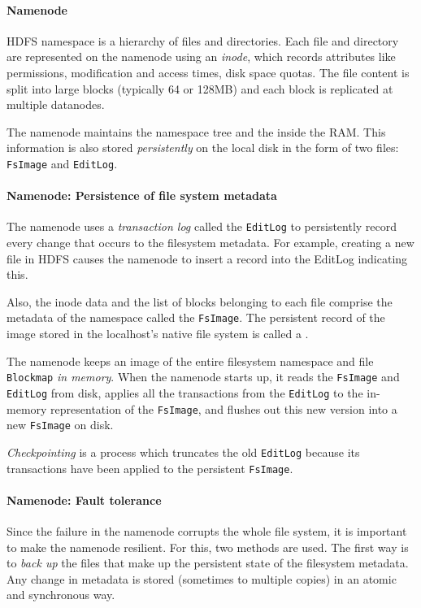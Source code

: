 \documentclass{memo}
\begin{document}
\paragraph{Namenode}
HDFS namespace is a hierarchy of files and directories. Each file and
directory are represented on the namenode using an {\em inode\/}, which
records attributes like permissions, modification and access times, disk space
quotas. The file content is split into large blocks (typically 64 or 128MB)
and each block is replicated at multiple datanodes. 

The namenode maintains the namespace tree and the  inside the RAM. This information is also stored {\em
  persistently\/} on the local disk 
in the form of two files: {\tt FsImage} and {\tt EditLog}. 

\paragraph{Namenode: Persistence of file system metadata}
The namenode uses a {\em transaction log\/} called the {\tt EditLog} to
persistently record every 
change that occurs to the filesystem metadata. For example, creating a new
file in HDFS causes the namenode to insert a record into the EditLog
indicating this. 

Also, the inode data and the list of blocks belonging to each file comprise
the metadata of the namespace called the {\tt FsImage}. The persistent record
of the image stored in the localhost's native file system is called a
. 

The namenode keeps an image of the entire filesystem namespace and file
{\tt Blockmap} {\em in memory\/}. When the namenode starts up, it reads the
{\tt FsImage} and {\tt EditLog} from disk, applies all the transactions from
the {\tt EditLog} to the in-memory representation of the {\tt FsImage}, and
flushes out this new version into a new {\tt FsImage} on disk. 

{\em Checkpointing} is a process which truncates the old {\tt EditLog} because
its transactions have been applied to the persistent {\tt FsImage}. 

\paragraph{Namenode: Fault tolerance}
Since the failure in the namenode corrupts the whole file system, it is
important to make the namenode resilient. For this, two methods are
used. The first way is to {\em back up} the files that make up the persistent
state of the filesystem metadata. Any change in metadata is stored (sometimes
to multiple copies) in an atomic and synchronous way.
\end{document}

